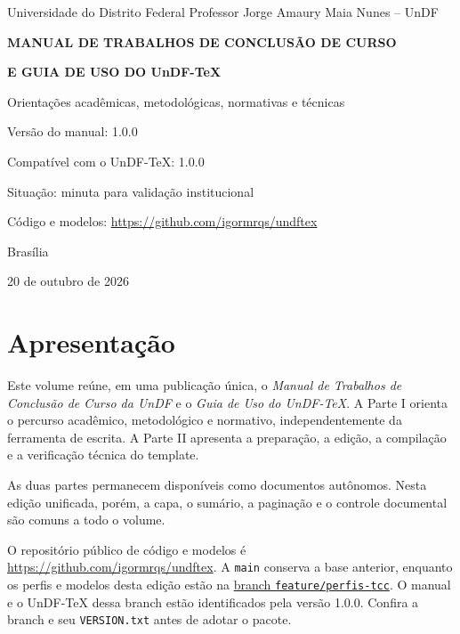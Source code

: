 \documentclass[12pt,a4paper,oneside]{report}
\begin{document}

\begin{titlepage}
  \centering
  \vspace*{1.2cm}
  {\large Universidade do Distrito Federal Professor Jorge Amaury Maia Nunes -- UnDF\par}
  \vspace{2.7cm}
  {\bfseries\Large MANUAL DE TRABALHOS DE CONCLUSÃO DE CURSO\par}
  \vspace{0.35cm}
  {\bfseries\Large E GUIA DE USO DO UnDF-TeX\par}
  \vspace{0.9cm}
  {\normalsize Orientações acadêmicas, metodológicas, normativas e técnicas\par}
  \vfill
  {\normalsize Versão do manual: 1.0.0\par}
  {\normalsize Compatível com o UnDF-TeX: 1.0.0\par}
  {\normalsize Situação: minuta para validação institucional\par}
  \medskip
  {\small Código e modelos: \url{https://github.com/igormrqs/undftex}\par}
  \medskip
  {\normalsize Brasília\par}
  {\normalsize 20 de outubro de 2026\par}
\end{titlepage}

\manualfrontmatter

\chapter*{Apresentação}

Este volume reúne, em uma publicação única, o \emph{Manual de Trabalhos de Conclusão de Curso da UnDF} e o \emph{Guia de Uso do UnDF-TeX}. A Parte I orienta o percurso acadêmico, metodológico e normativo, independentemente da ferramenta de escrita. A Parte II apresenta a preparação, a edição, a compilação e a verificação técnica do template.

As duas partes permanecem disponíveis como documentos autônomos. Nesta edição unificada, porém, a capa, o sumário, a paginação e o controle documental são comuns a todo o volume.

O repositório público de código e modelos é
\url{https://github.com/igormrqs/undftex}. A \texttt{main} conserva a base
anterior, enquanto os perfis e modelos desta edição estão na
\href{https://github.com/igormrqs/undftex/tree/feature/perfis-tcc}{branch \texttt{feature/perfis-tcc}}.
O manual e o UnDF-TeX dessa branch estão identificados pela versão 1.0.0.
Confira a branch e seu \texttt{VERSION.txt} antes de adotar o pacote.
\end{document}
